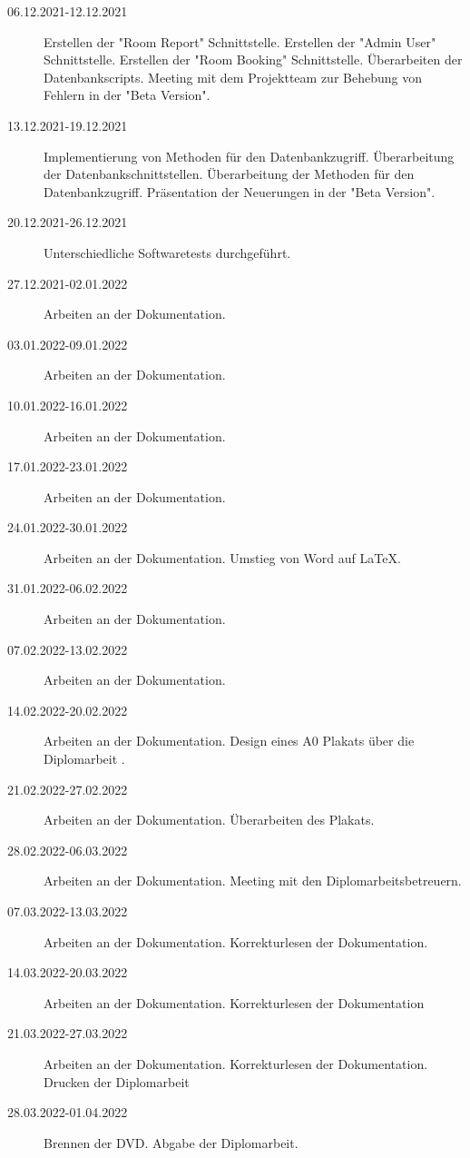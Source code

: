 \begin{description}
    \item[06.12.2021-12.12.2021] Erstellen der "Room Report" Schnittstelle. Erstellen der "Admin User" Schnittstelle. Erstellen der "Room Booking" Schnittstelle. Überarbeiten der Datenbankscripts. Meeting mit dem Projektteam zur Behebung von Fehlern in der "Beta Version". 
    \item[13.12.2021-19.12.2021] Implementierung von Methoden für den Datenbankzugriff. Überarbeitung der Datenbankschnittstellen. Überarbeitung der Methoden für den Datenbankzugriff. Präsentation der Neuerungen in der "Beta Version". 
    \item[20.12.2021-26.12.2021] Unterschiedliche Softwaretests durchgeführt. 
    \item[27.12.2021-02.01.2022] Arbeiten an der Dokumentation.
    \item[03.01.2022-09.01.2022] Arbeiten an der Dokumentation.
    \item[10.01.2022-16.01.2022] Arbeiten an der Dokumentation.
    \item[17.01.2022-23.01.2022] Arbeiten an der Dokumentation.
    \item[24.01.2022-30.01.2022] Arbeiten an der Dokumentation. \newline Umstieg von Word auf \mbox{LaTeX}.
    \item[31.01.2022-06.02.2022] Arbeiten an der Dokumentation.
    \item[07.02.2022-13.02.2022] Arbeiten an der Dokumentation.
    \item[14.02.2022-20.02.2022] Arbeiten an der Dokumentation. Design eines A0 Plakats über die Diplomarbeit \ZELIA.
    \item[21.02.2022-27.02.2022] Arbeiten an der Dokumentation. Überarbeiten des Plakats.
    \item[28.02.2022-06.03.2022] Arbeiten an der Dokumentation. Meeting mit den Diplomarbeitsbetreuern.
    \item[07.03.2022-13.03.2022] Arbeiten an der Dokumentation. Korrekturlesen der Dokumentation.
    \item[14.03.2022-20.03.2022] Arbeiten an der Dokumentation. Korrekturlesen der Dokumentation 
    \item[21.03.2022-27.03.2022] Arbeiten an der Dokumentation. Korrekturlesen der Dokumentation. Drucken der Diplomarbeit
    \item[28.03.2022-01.04.2022] Brennen der DVD. Abgabe der Diplomarbeit.
\end{description}